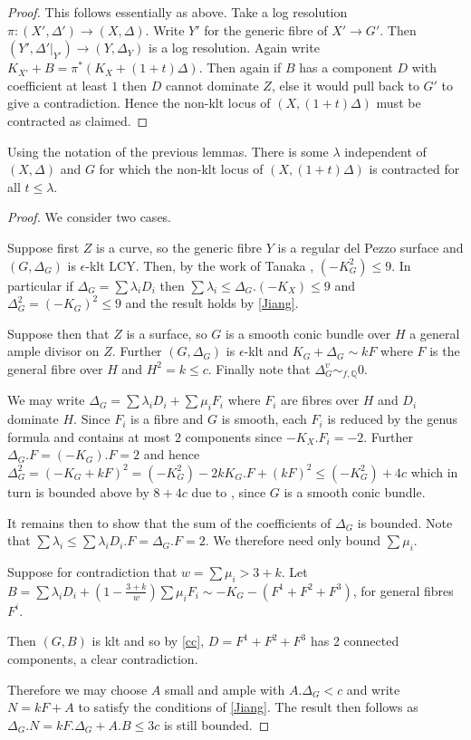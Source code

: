 \documentclass[a4paper,12pt]{book}
\begin{document}
\begin{proof}
	This follows essentially as above.
	Take a log resolution $\pi\colon (X',\Delta') \to (X,\Delta)$. Write $Y'$ for the generic fibre of $X' \to G'$. Then $(Y',\Delta'|_{Y'}) \to (Y,\Delta_{Y})$ is a log resolution. Again write $K_{X'}+B=\pi^{*}(K_{X}+(1+t)\Delta)$. Then again if $B$ has a component $D$ with coefficient at least $1$ then $D$ cannot dominate $Z$, else it would pull back to $G'$ to give a contradiction. Hence the non-klt locus of $(X,(1+t)\Delta)$ must be contracted as claimed. 
\end{proof}

\begin{lemma}
	Using the notation of the previous lemmas. There is some $\lambda$ independent of $(X,\Delta)$ and $G$ for which the non-klt locus of $(X,(1+t)\Delta)$ is contracted for all $t \leq \lambda$.
\end{lemma}
\begin{proof}
	We consider two cases. 
	
	Suppose first $Z$ is a curve, so the generic fibre $Y$ is a regular del Pezzo surface and $(G,\Delta_{G})$ is $\epsilon$-klt LCY. Then, by the work of Tanaka \cite[Corollary 4.8]{tanaka2019boundedness}, $(-K_{G}^{2}) \leq 9$. In particular if $\Delta_{G}=\sum \lambda_{i}D_{i}$ then $\sum \lambda_{i} \leq \Delta_{G}.(-K_{X}) \leq 9$ and $\Delta_{G}^{2} =(-K_{G})^{2} \leq 9$ and the result holds by \autoref{Jiang}. 
	
	Suppose then that $Z$ is a surface, so $G$ is a smooth conic bundle over $H$ a general ample divisor on $Z$. Further $(G,\Delta_{G})$ is $\epsilon$-klt and $K_{G}+\Delta_{G}\sim kF$ where $F$ is the general fibre over $H$ and $H^{2}=k \leq c$. Finally note that $\Delta_{G}^{v} \sim_{f,\mathbb{Q}} 0$.
	
	We may write $\Delta_{G}= \sum \lambda_{i}D_{i}+ \sum \mu_{i}F_{i}$ where $F_{i}$ are fibres over $H$ and $D_{i}$ dominate $H$. Since $F_{i}$ is a fibre and $G$ is smooth, each $F_{i}$ is reduced by the genus formula and contains at most $2$ components since $-K_{X}.F_{i}=-2$. Further $\Delta_{G}.F=(-K_{G}).F=2$ and hence $\Delta_{G}^{2}=(-K_{G}+kF)^{2}=(-K_{G}^{2})-2kK_{G}.F +(kF)^{2} \leq (-K_{G}^{2})+4c$ which in turn is bounded above by $8+4c$ due to \cite[Proposition III.21]{beauville1996complex}, since $G$ is a smooth conic bundle.
	
	It remains then to show that the sum of the coefficients of $\Delta_{G}$ is bounded. Note that $\sum \lambda_{i} \leq \sum \lambda_{i}D_{i}.F =\Delta_{G}.F =2$. We therefore need only bound $\sum \mu_{i}$.
	
	Suppose for contradiction that $w=\sum \mu_{i} >3 +k$. Let $B=\sum \lambda_{i}D_{i} +(1-\frac{3+k}{w})\sum \mu_{i}F_{i}  \sim -K_{G}-(F^{1}+F^{2}+F^{3})$, for general fibres $F^{i}$.
	
	Then $(G,B)$ is klt and so by \autoref{cc}, $D=F^{1}+F^{2}+F^{3}$ has 2 connected components, a clear contradiction.
	
	Therefore we may choose $A$ small and ample with $A.\Delta_{G} < c$ and write $N=kF+A$ to satisfy the conditions of \autoref{Jiang}. The result then follows as $\Delta_{G}.N=kF.\Delta_{G}+A.B\leq 3c$ is still bounded.
\end{proof}
\end{document}
